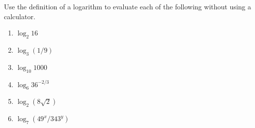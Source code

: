 Use the definition of a logarithm to evaluate each of the following without using a calculator.  

\begin{enumerate}
\item   $\log_2 16$

\item   $\log_3 (1/9)$

\item   $\log_{10} 1000$

\item   $\log_{6} 36^{-2/3}$

\item   $\log_{2} (8\sqrt{2})$

\item $\log_7(49^x/343^y)$

%


\end{enumerate}
